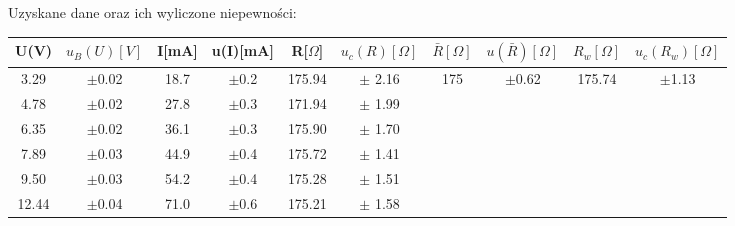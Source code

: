 \documentclass{article}
\begin{document}
\begin{table}[h]
    Uzyskane dane oraz ich wyliczone niepewności:\\
    \renewcommand{\arraystretch}{1.3}
\begin{tabular}{ |c|c|c|c|c|c|c|c|c|c| }
    \hline
    U(V)&$u_B (U)[V]$&I[mA]&u(I)[mA]&R[$\Omega$]&$u_c(R)[\Omega]$&$\bar{R}[\Omega]$&$u(\bar{R})[\Omega]$&$R_w[\Omega]$&$u_c(R_w)[\Omega]$ \\
    \hline \hline
    3.29&$\pm$0.02&18.7&$\pm$0.2&175.94&$\pm$ 2.16& \multirow{6}{*}{175}&\multirow{6}{*}{$\pm$0.62}&\multirow{6}{*}{175.74}&\multirow{6}{*}{$\pm$1.13}\\ 
    \cline{1-6}

    4.78&$\pm$0.02&27.8&$\pm$0.3&171.94&$\pm$ 1.99&&&&\\ 
    \cline{1-6}
  
    6.35&$\pm$0.02&36.1&$\pm$0.3&175.90&$\pm$ 1.70&&&&\\ 
    \cline{1-6}

    7.89&$\pm$0.03&44.9&$\pm$0.4&175.72&$\pm$ 1.41&&&&\\ 
    \cline{1-6}

    9.50&$\pm$0.03&54.2&$\pm$0.4&175.28&$\pm$ 1.51&&&&\\ 
    \cline{1-6}
    
    12.44&$\pm$0.04&71.0&$\pm$0.6&175.21&$\pm$ 1.58&&&&\\ 

    \hline
\end{tabular}
\label{tabular: t}
\end{table}
\newpage
\end{document}
